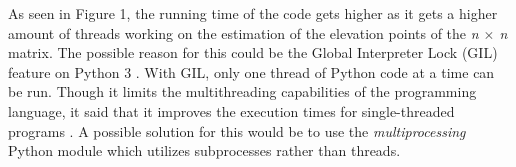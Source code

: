 \documentclass{article}
\begin{document}
\indent As seen in Figure 1, the running time of the code gets higher as it gets a higher amount of threads working on the estimation of the elevation points of the \emph{n $\times$ n} matrix. The possible reason for this could be the Global Interpreter Lock (GIL) feature on Python 3 \cite{intro, gil}. With GIL, only one thread of Python code at a time can be run. Though it limits the multithreading capabilities of the programming language, it said that it improves the execution times for single-threaded programs \cite{thread-based}. A possible solution for this would be to use the \emph{multiprocessing} Python module \cite{multiprocessing} which utilizes subprocesses rather than threads.
\begin{table}[H]
    \noindent{}
\end{table}
\end{document}
